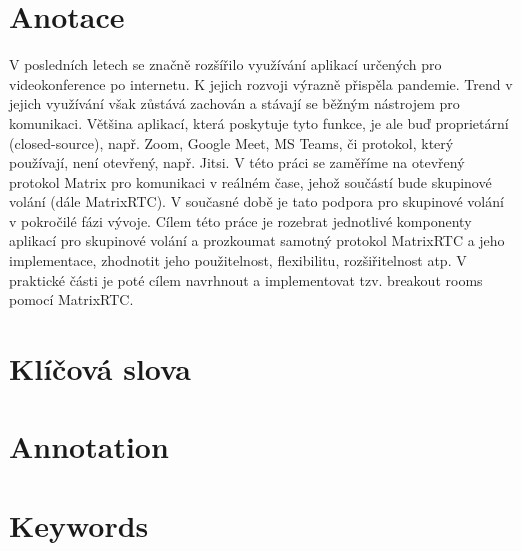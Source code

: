 \section*{Anotace}
V posledních letech se značně rozšířilo využívání aplikací určených pro
videokonference po internetu. K jejich rozvoji výrazně přispěla pandemie. Trend
v jejich využívání však zůstává zachován a stávají se běžným nástrojem pro
komunikaci. Většina aplikací, která poskytuje tyto funkce, je ale buď
proprietární (closed-source), např. Zoom, Google Meet, MS Teams, či protokol,
který používají, není otevřený, např. Jitsi. V této práci se zaměříme na
otevřený protokol Matrix pro komunikaci v reálném čase, jehož součástí bude
skupinové volání (dále MatrixRTC). V současné době je tato podpora pro skupinové
volání v pokročilé fázi vývoje. Cílem této práce je rozebrat jednotlivé
komponenty aplikací pro skupinové volání a prozkoumat samotný protokol MatrixRTC
a jeho implementace, zhodnotit jeho použitelnost, flexibilitu, rozšiřitelnost
atp. V praktické části je poté cílem navrhnout a implementovat tzv. breakout
rooms pomocí MatrixRTC.

\section*{Klíčová slova}

\section*{Annotation}

\section*{Keywords}
